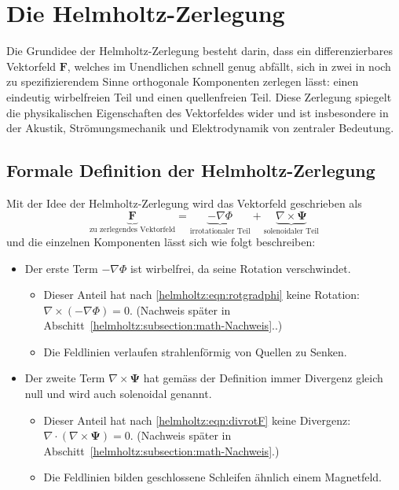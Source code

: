 %
%
%
%
\section{Die Helmholtz-Zerlegung
\label{helmholtz:section:Helmholtz_Zerlegung}}

Die Grundidee der Helmholtz-Zerlegung besteht darin, dass ein
differenzierbares  Vektorfeld $\boldsymbol{F}$, welches im Unendlichen
schnell genug abfällt, sich in zwei in noch zu spezifizierendem
Sinne orthogonale Komponenten zerlegen lässt: einen eindeutig
wirbelfreien Teil und einen quellenfreien Teil.
Diese Zerlegung spiegelt die physikalischen Eigenschaften des
Vektorfeldes wider und ist insbesondere in der Akustik, Strömungsmechanik
%
und Elektrodynamik von zentraler Bedeutung.
%

\subsection{Formale Definition der Helmholtz-Zerlegung
\label{helmholtz:subsection:def_Helmholtz_Zerlegung}}

Mit der Idee der Helmholtz-Zerlegung wird das Vektorfeld geschrieben als
\begin{equation*}
\underbrace{
\boldsymbol{F}
}_{
\textstyle\text{zu zerlegendes Vektorfeld}
}
=
\underbrace{
-\nabla \Phi
}_{
\textstyle\text{irrotationaler Teil}
}
+
\underbrace{
\nabla \times \boldsymbol{\Psi}
}_{
\textstyle\text{solenoidaler Teil}
}
\end{equation*}
und die einzelnen Komponenten lässt sich wie folgt beschreiben:

\begin{itemize}
\item
Der erste Term $ -\nabla \Phi $ ist wirbelfrei, da seine Rotation verschwindet.
\begin{itemize}
\item
Dieser Anteil hat nach 
\eqref{helmholtz:eqn:rotgradphi}
keine Rotation: $\nabla \times (-\nabla \Phi) = 0$.
(Nachweis später in Abschitt~\ref{helmholtz:subsection:math-Nachweis}..)
\item
Die Feldlinien verlaufen strahlenförmig von Quellen zu Senken.
\end{itemize}

\item
Der zweite Term $\nabla \times \boldsymbol{\Psi}$ hat gemäss der
Definition immer Divergenz gleich null und wird auch solenoidal
genannt.
\begin{itemize}
\item
Dieser Anteil hat nach
\eqref{helmholtz:eqn:divrotF}
keine Divergenz: $\nabla \cdot (\nabla \times
\boldsymbol{\Psi}) = 0$.
(Nachweis später in Abschitt~\ref{helmholtz:subsection:math-Nachweis}.)
\item
Die Feldlinien bilden geschlossene Schleifen ähnlich einem Magnetfeld.
\end{itemize}
\end{itemize}

